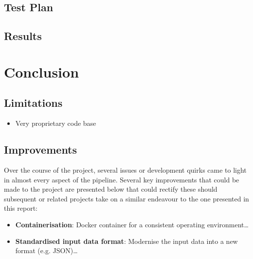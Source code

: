 \documentclass[conference]{IEEEtran}
\begin{document}
\subsection{Test Plan}

\subsection{Results}



\section{Conclusion}
\label{sec:conclusion}

\subsection{Limitations}

\begin{itemize}
    \item Very proprietary code base
\end{itemize}

\subsection{Improvements}

Over the course of the project, several issues or development quirks came to light in almost every aspect of the pipeline. Several key improvements that could be made to the project are presented below that could rectify these should subsequent or related projects take on a similar endeavour to the one presented in this report:

\begin{itemize}
    \item \textbf{Containerisation}: Docker container for a consistent operating environment\dots
    \item \textbf{Standardised input data format}: Modernise the input data into a new format (e.g. JSON)\dots
\end{itemize}




\end{document}
